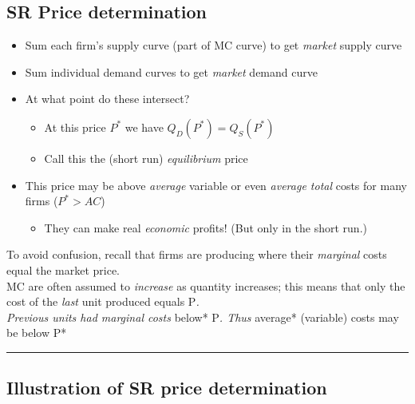 \documentclass[]{article}
\providecommand{\tightlist}{%
  \setlength{\itemsep}{0pt}\setlength{\parskip}{0pt}}
\begin{document}
\hypertarget{sr-price-determination}{%
\subsection{SR Price determination}\label{sr-price-determination}}

\begin{itemize}
\tightlist
\item
  Sum each firm's supply curve (part of MC curve) to get \emph{market}
  supply curve
\item
  Sum individual demand curves to get \emph{market} demand curve
\item
  At what point do these intersect?

  \begin{itemize}
  \tightlist
  \item
    At this price \(P^*\) we have \(Q_D(P^*)=Q_S(P^*)\)
  \item
    Call this the (short run) \emph{equilibrium} price
  \end{itemize}
\end{itemize}

\bigskip

\begin{itemize}
\item
  This price may be above \emph{average} variable or even \emph{average
  total} costs for many firms (\(P^*>AC\))

  \begin{itemize}
  \tightlist
  \item
    They can make real \emph{economic} profits! (But only in the short
    run.)
  \end{itemize}
\end{itemize}

To avoid confusion, recall that firms are producing where their
\emph{marginal} costs equal the market price.\\
MC are often assumed to \emph{increase} as quantity increases; this
means that only the cost of the \emph{last} unit produced equals
P\emph{.\\
Previous units had marginal costs }below* P\emph{. Thus }average*
(variable) costs may be below P*

\begin{center}\rule{0.5\linewidth}{\linethickness}\end{center}

\hypertarget{illustration-of-sr-price-determination}{%
\subsection{Illustration of SR price
determination}\label{illustration-of-sr-price-determination}}
\end{document}
